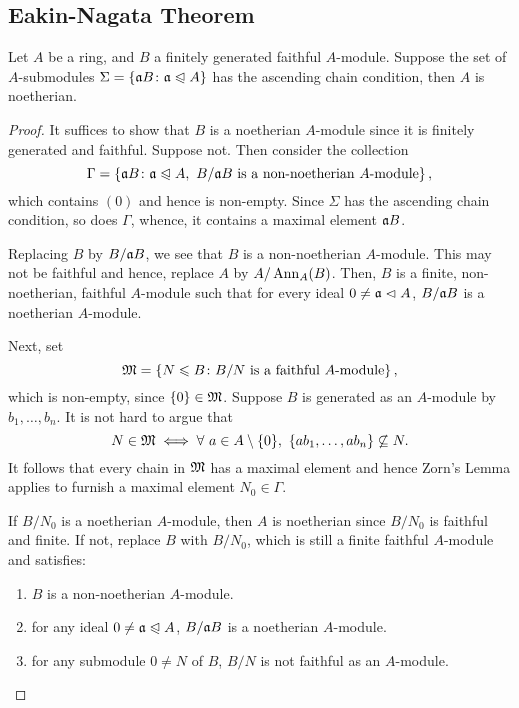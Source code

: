 \subsection{Eakin-Nagata Theorem}

\begin{theorem}[Formanek]
    Let $A$ be a ring, and $B$ a finitely generated faithful $A$-module. Suppose the set of $A$-submodules $\Sigma = \left\{\mathfrak{a} B\colon \mathfrak{a}\trianglelefteqslant A\right\}$ has the ascending chain condition, then $A$ is noetherian.
\end{theorem}
\begin{proof}
    It suffices to show that $B$ is a noetherian $A$-module since it is finitely generated and faithful. Suppose not. Then consider the collection 
    \begin{equation*}
        \Gamma = \left\{\mathfrak{a} B\colon \mathfrak{a}\trianglelefteqslant A,~B/\mathfrak{a} B\text{ is a non-noetherian }A\text{-module}\right\},
    \end{equation*}
    which contains $(0)$ and hence is non-empty. Since $\Sigma$ has the ascending chain condition, so does $\Gamma$, whence, it contains a maximal element $\mathfrak{a} B$. 

    Replacing $B$ by $B/\mathfrak{a} B$, we see that $B$ is a non-noetherian $A$-module. This may not be faithful and hence, replace $A$ by $A/\operatorname{Ann}_A(B)$. Then, $B$ is a finite, non-noetherian, faithful $A$-module such that for every ideal $0\ne\mathfrak{a}\vartriangleleft A$, $B/\mathfrak{a} B$ is a noetherian $A$-module.

    Next, set 
    \begin{equation*}
        \mathfrak{M} = \left\{N\leqslant B\colon B/N\text{ is a faithful }A\text{-module}\right\},
    \end{equation*}
    which is non-empty, since $\{0\}\in\mathfrak{M}$. Suppose $B$ is generated as an $A$-module by $b_1,\dots, b_n$. It is not hard to argue that 
    \begin{equation*}
        N\in\mathfrak{M}\iff \forall~a\in A\setminus\{0\},~\{ab_1,\dots, ab_n\}\not\subseteq N.
    \end{equation*}
    It follows that every chain in $\mathfrak{M}$ has a maximal element and hence Zorn's Lemma applies to furnish a maximal element $N_0\in\Gamma$.

    If $B/N_0$ is a noetherian $A$-module, then $A$ is noetherian since $B/N_0$ is faithful and finite. If not, replace $B$ with $B/N_0$, which is still a finite faithful $A$-module and satisfies: 
    \begin{enumerate}[label=(\arabic*)]
        \item $B$ is a non-noetherian $A$-module. 
        \item for any ideal $0\ne\mathfrak{a}\trianglelefteqslant A$, $B/\mathfrak{a} B$ is a noetherian $A$-module. 
        \item for any submodule $0\ne N$ of $B$, $B/N$ is not faithful as an $A$-module.
    \end{enumerate}


\end{proof}
